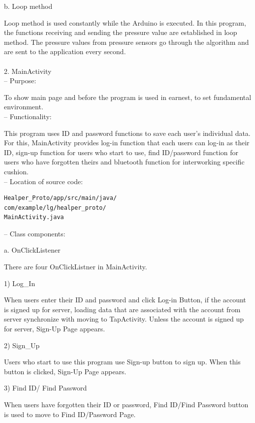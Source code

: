 \documentclass[conference]{IEEEtran}
\begin{document}
b. Loop method 

Loop method is used constantly while the Arduino is executed. In this program, the functions receiving and sending the pressure value are established in loop method. The pressure values from pressure sensors go through the algorithm and are sent to the application every second.\\\\

2. MainActivity\\

 --	Purpose:
 
To show main page and before the program is used in earnest, to set fundamental environment.\\

 --	Functionality:
 
This program uses ID and password functions to save each user's individual data. For this, MainActivity provides log-in function that each users can log-in as their ID, sign-up function for users who start to use, find ID/password function for users who have forgotten theirs and bluetooth function for interworking specific cushion. \\

 -- Location of source code:
 
\begin{verbatim}
Healper_Proto/app/src/main/java/
com/example/lg/healper_proto/
MainActivity.java
\end{verbatim}

 -- Class components:

a. OnClickListener

There are four OnClickListner in MainActivity.

  1) Log\_{}In
  
When users enter their ID and password and click Log-in Button, if the account is signed up for server, loading data that are associated with the account from server synchronize with moving to TapActivity. Unless the account is signed up for server, Sign-Up Page appears.

  2) Sign\_{}Up
  
Users who start to use this program use Sign-up button to sign up. When this button is clicked, Sign-Up Page appears.

  3) Find ID/ Find Password
  
When users have forgotten their ID or password, Find ID/Find Password button is used to move to Find ID/Password Page.\\\\
\end{document}
